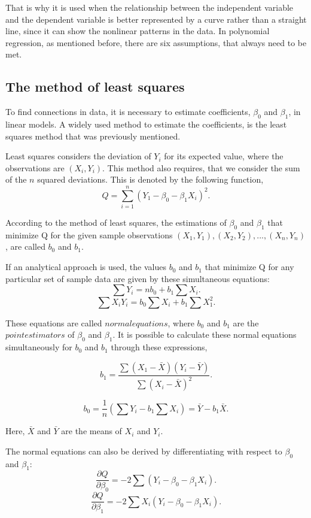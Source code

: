 \noindent That is why it is used when the relationship between the independent variable and the dependent variable is better represented by a curve rather than a straight line, since it can show the nonlinear patterns in the data.
In polynomial regression, as mentioned before, there are six assumptions, that always need to be met.


\subsection{The method of least squares}
To find connections in data, it is necessary to estimate coefficients, $\beta_0$ and $\beta_1$, in linear models. 
A widely used method to estimate the coefficients, is the least squares method that was previously mentioned. 

\noindent Least squares considers the deviation of $Y_i$ for  its expected value, where the observations are $(X_i, Y_i)$. 
This method also requires, that we consider the sum of the $n$ squared deviations.
This is denoted by the following function,
$$Q=\sum_{i=1}^{n}(Y_1-\beta_0 - \beta_1 X_i)^2 .$$

\noindent According to the method of least squares, the estimations of $\beta_0$ and $\beta_1$ that minimize Q for the given sample observations $(X_1,Y_1), (X_2,Y_2), ..., (X_n,Y_n)$, are called $b_0$ and $b_1$.  

\noindent If an analytical approach is used, the values $b_0$ and $b_1$ that minimize Q for any particular set of sample data are given by these simultaneous equations: 
$$\sum Y_i =n b_0 +b_1 \sum X_i .$$
$$\sum X_i Y_i = b_0 \sum X_i + b_1 \sum X_1^2 .$$

\noindent These equations are called $normal equations$, where $b_0$ and $b_1$ are the $point estimators$ of $\beta_0$ and $\beta_1$. It is possible to calculate these normal equations simultaneously for $b_0$ and $b_1$ through these expressions,

$$b_1 = \frac{\sum (X_1 - \bar{X}) (Y_i - \bar{Y})}{\sum (X_i - \bar{X})^2} .$$

$$b_0 = \frac{1}{n} (\sum Y_i - b_1 \sum X_i ) = \bar{Y} - b_1 \bar{X} .$$

\noindent Here, $\bar{X}$ and $\bar{Y}$ are the means of $X_i$ and $Y_i$.

\noindent The normal equations can also be derived by differentiating with respect to $\beta_0$ and $\beta_1$:
$$\frac{\partial Q}{\partial \beta_0}=-2 \sum (Y_i - \beta_0 - \beta_1 X_i) .$$
$$\frac{\partial Q} {\partial \beta_1} = -2 \sum X_i (Y_i - \beta_0 - \beta_1 X_i) .$$

